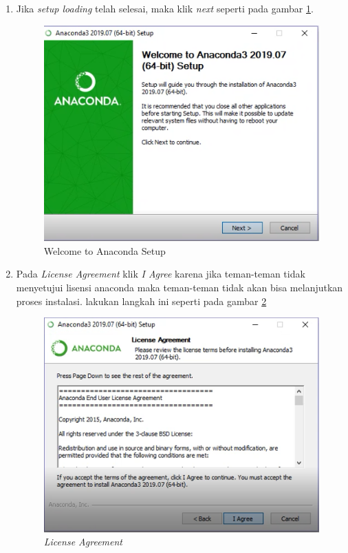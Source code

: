 \begin{enumerate}
\item Jika \textit{setup loading} telah selesai, maka klik \textit{next} seperti pada gambar \ref{langkah3}.
\begin{figure}[H]
        \centerline{\includegraphics[scale=0.75]{figures/3}}
        \caption{Welcome to Anaconda Setup}
		\label{langkah3}
\end{figure}

\item Pada \textit{License Agreement} klik \textit{I Agree} karena jika teman-teman tidak menyetujui lisensi anaconda maka teman-teman tidak akan bisa melanjutkan proses instalasi. lakukan langkah ini seperti pada gambar \ref{Figureanaconda3}

\begin{figure}[H]
    \centering
    \includegraphics[scale=0.75]{figures/4}
    \caption{\textit{License Agreement}}
    \label{Figureanaconda3}
\end{figure}



\end{enumerate}
